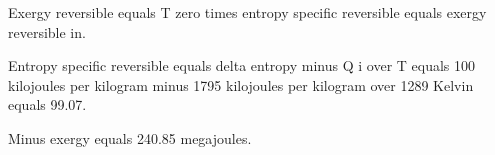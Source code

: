 Exergy reversible equals T zero times entropy specific reversible equals exergy reversible in.

Entropy specific reversible equals delta entropy minus Q i over T equals 100 kilojoules per kilogram minus 1795 kilojoules per kilogram over 1289 Kelvin equals 99.07.

Minus exergy equals 240.85 megajoules.